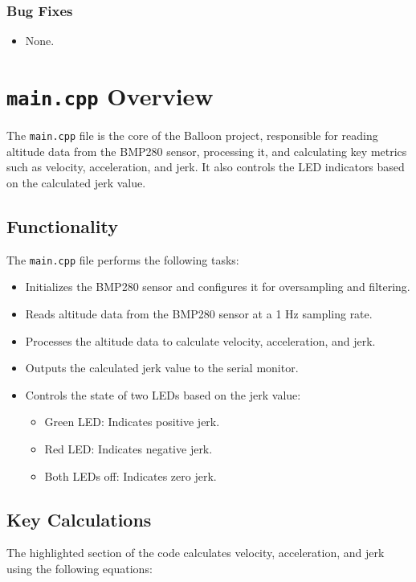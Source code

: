 \documentclass{article}
\begin{document}
\subsubsection{Bug Fixes}
\begin{itemize}
    \item None.
\end{itemize}



\section{\texttt{main.cpp} Overview}
The \texttt{main.cpp} file is the core of the Balloon project, responsible for reading altitude data from the BMP280 sensor, processing it, and calculating key metrics such as velocity, acceleration, and jerk. It also controls the LED indicators based on the calculated jerk value.

\subsection{Functionality}
The \texttt{main.cpp} file performs the following tasks:
\begin{itemize}
    \item Initializes the BMP280 sensor and configures it for oversampling and filtering.
    \item Reads altitude data from the BMP280 sensor at a 1 Hz sampling rate.
    \item Processes the altitude data to calculate velocity, acceleration, and jerk.
    \item Outputs the calculated jerk value to the serial monitor.
    \item Controls the state of two LEDs based on the jerk value:
    \begin{itemize}
        \item Green LED: Indicates positive jerk.
        \item Red LED: Indicates negative jerk.
        \item Both LEDs off: Indicates zero jerk.
    \end{itemize}
\end{itemize}

\subsection{Key Calculations}
The highlighted section of the code calculates velocity, acceleration, and jerk using the following equations:
\end{document}
